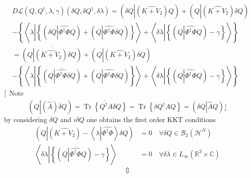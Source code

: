 \documentclass[aps,preprint]{revtex4}%
\begin{document}
\begin{align}
&  D\mathcal{L}\left(  Q,Q^{\dagger},\lambda,\gamma\right)  \left(  \delta
Q,\delta Q^{\dagger},\delta\lambda\right)  =\left(  \delta Q\left\vert \left(
\widehat{K+V_{2}}\right)  Q\right.  \right)  +\left(  Q\left\vert \left(
\widehat{K+V_{2}}\right)  \delta Q\right.  \right) \nonumber\\
&  -\left\{  \left\langle \lambda\left\vert \left\{  \left(  \delta
Q\left\vert \widehat{\Phi^{\dagger}\Phi}Q\right.  \right)  +\left(
Q\left\vert \widehat{\Phi^{\dagger}\Phi}\delta Q\right.  \right)  \right\}
\right.  \right\rangle +\left\langle \delta\lambda\left\vert \left\{  \left(
Q\left\vert \widehat{\Phi^{\dagger}\Phi}Q\right.  \right)  -\gamma\right\}
\right.  \right\rangle \right\} \nonumber\\
&  =\overline{\left(  Q\left\vert \left(  \widehat{K+V_{2}}\right)  \delta
Q\right.  \right)  }+\left(  Q\left\vert \left(  \widehat{K+V_{2}}\right)
\delta Q\right.  \right) \nonumber\\
&  -\left\{  \left\langle \lambda\left\vert \left\{  \overline{\left(
Q\left\vert \widehat{\Phi^{\dagger}\Phi}\delta Q\right.  \right)  }+\left(
Q\left\vert \widehat{\Phi^{\dagger}\Phi}\delta Q\right.  \right)  \right\}
\right.  \right\rangle +\left\langle \delta\lambda\left\vert \left\{  \left(
Q\left\vert \widehat{\Phi^{\dagger}\Phi}Q\right.  \right)  -\gamma\right\}
\right.  \right\rangle \right\}
\end{align}
$\lceil$ Note
\begin{equation}
\overline{\left(  Q\left\vert \left(  \widehat{A}\right)  \delta Q\right.
\right)  }=\overline{\operatorname{Tr}\left\{  Q^{\dagger}A\delta Q\right\}
}=\operatorname{Tr}\left\{  \delta Q^{\dagger}AQ\right\}  =\left(  \delta
Q\left\vert \widehat{A}Q\right.  \right)  \rfloor
\end{equation}
by considering $\delta Q$ and $i\delta Q$ one obtains the first order KKT
conditions
\begin{subequations}
\begin{align}
\left(  Q\left\vert \left(  \widehat{K+V_{2}}\right)  -\left\langle
\lambda\left\vert \widehat{\Phi^{\dagger}\Phi}\right.  \right\rangle \right.
\delta Q\right)   &  =0\quad\forall\delta Q\in\mathcal{B}_{2}\left(
\mathcal{H}^{N}\right) \\
\left\langle \delta\lambda\left\vert \left\{  \left(  Q\left\vert
\widehat{\Phi^{\dagger}\Phi}Q\right.  \right)  -\gamma\right\}  \right.
\right\rangle  &  =0\quad\forall\delta\lambda\in L_{\infty}\left(
\mathbb{R}^{3}\times\mathbb{C}\right)
\end{align}%
\end{subequations}
\[
\Updownarrow
\]
%
\end{document}
